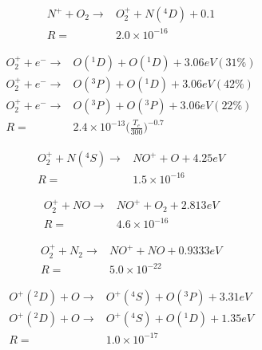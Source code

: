 \documentclass[twoside,10pt]{book}
\begin{document}
\begin{equation}
\begin{split}
N^+ + O_2 \rightarrow & O_2^+ + N(^4D) + 0.1 \\
R = & 2.0 \times 10^{-16}
\end{split}
\end{equation}

\begin{equation}
\begin{split}
O_2^+ + e^- \rightarrow & O(^1D) + O(^1D) + 3.06 eV (31\%) \\
O_2^+ + e^- \rightarrow & O(^3P) + O(^1D) + 3.06 eV (42\%) \\
O_2^+ + e^- \rightarrow & O(^3P) + O(^3P) + 3.06 eV (22\%) \\
R = & 2.4\times 10^{-13} \bigg(\frac{T_e}{300}\bigg)^{-0.7}
\end{split}
\end{equation}

\begin{equation}
\begin{split}
O_2^+ + N(^4S) \rightarrow & NO^+ + O + 4.25 eV \\
R = & 1.5 \times 10^{-16}
\end{split}
\end{equation}

\begin{equation}
\begin{split}
O_2^+ + NO \rightarrow & NO^+ + O_2  + 2.813 eV \\
R = & 4.6 \times 10^{-16}
\end{split}
\end{equation}

\begin{equation}
\begin{split}
O_2^+ + N_2 \rightarrow & NO^+ + NO + 0.9333 eV \\
R = & 5.0 \times 10^{-22}
\end{split}
\end{equation}

\begin{equation}
\begin{split}
O^+(^2D) + O \rightarrow &  O^+(^4S) + O(^3P) + 3.31 eV \\
O^+(^2D) + O \rightarrow &  O^+(^4S) + O(^1D) + 1.35 eV \\
R = & 1.0 \times 10^{-17}
\end{split}
\end{equation}
\end{document}
